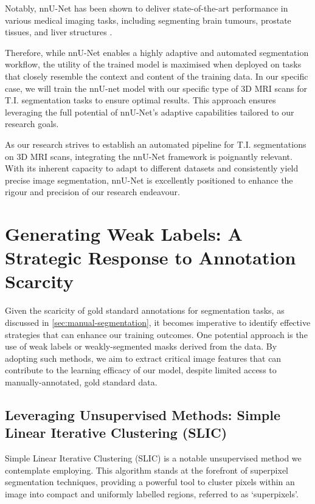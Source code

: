 Notably, nnU-Net has been shown to deliver state-of-the-art performance in various medical imaging tasks, including segmenting brain tumours, prostate tissues, and liver structures \cite{isensee2019nnu}.

Therefore, while nnU-Net enables a highly adaptive and automated segmentation workflow, the utility of the trained model is maximised when deployed on tasks that closely resemble the context and content of the training data. In our specific case, we will train the nnU-net model with our specific type of 3D MRI scans for T.I. segmentation tasks to ensure optimal results. This approach ensures leveraging the full potential of nnU-Net's adaptive capabilities tailored to our research goals.

As our research strives to establish an automated pipeline for T.I. segmentations on 3D MRI scans, integrating the nnU-Net framework is poignantly relevant. With its inherent capacity to adapt to different datasets and consistently yield precise image segmentation, nnU-Net is excellently positioned to enhance the rigour and precision of our research endeavour.

\section{Generating Weak Labels: A Strategic Response to Annotation Scarcity}

Given the scaricity of gold standard annotations for segmentation tasks, as discussed in \autoref{sec:manual-segmentation}, it becomes imperative to identify effective strategies that can enhance our training outcomes. One potential approach is the use of weak labels or weakly-segmented masks derived from the data. By adopting such methods, we aim to extract critical image features that can contribute to the learning efficacy of our model, despite limited access to manually-annotated, gold standard data.

\subsection{Leveraging Unsupervised Methods: Simple Linear Iterative Clustering (SLIC)}

Simple Linear Iterative Clustering (SLIC) \cite{achanta2010slic} is a notable unsupervised method we contemplate employing. This algorithm stands at the forefront of superpixel segmentation techniques, providing a powerful tool to cluster pixels within an image into compact and uniformly labelled regions, referred to as `superpixels'.


